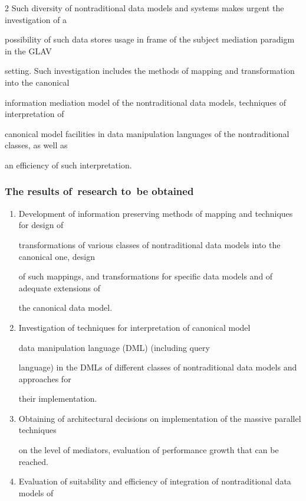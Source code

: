 \begin{multicols}{2}
Such diversity of nontraditional data models and systems makes urgent the investigation of a 

possibility of such data stores usage in frame of the subject mediation paradigm in the GLAV 

setting. Such investigation includes the methods of mapping and transformation into the canonical 

information mediation model of the nontraditional data models, techniques of interpretation of 

canonical model facilities in data manipulation languages of the nontraditional classes, as well as 

an efficiency of such interpretation.



\subsubsection{The results of~research to~be obtained}



\noindent

\begin{enumerate}[1.]

\item Development of information preserving methods of mapping and techniques for design of 

transformations of various classes of nontraditional data models into the canonical one, design 

of such mappings, and transformations for specific data models and of adequate extensions of 

the canonical data model.

\item Investigation of techniques for interpretation of canonical model 

data manipulation language (DML) (including query 

language) in the DMLs of different classes of nontraditional data models and approaches for 

their implementation.

\item Obtaining of architectural decisions on implementation of the massive parallel techniques 

on the level of mediators, evaluation of performance growth that can be reached.

\item Evaluation of suitability and efficiency of integration of nontraditional data models of 


\end{enumerate}
\end{multicols}
